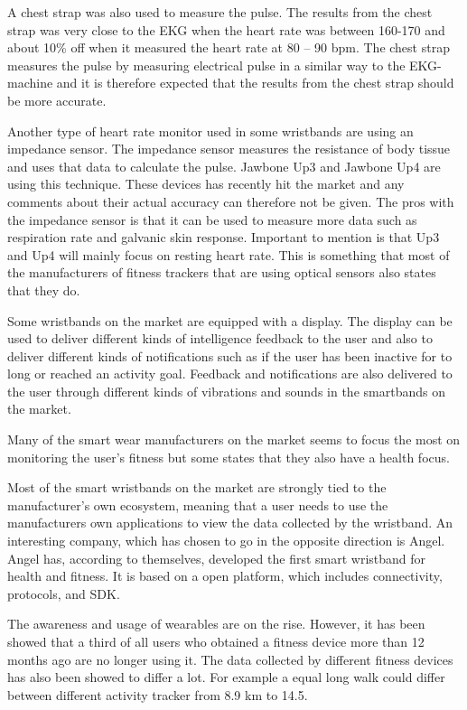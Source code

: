 \documentclass{cslthse-msc}
\begin{document}
A chest strap was also used to measure the pulse. The results from the chest strap was very close to the EKG when the heart rate was between 160-170 and about 10\% off when it measured the heart rate at 80 – 90 bpm. The chest strap measures the pulse by measuring electrical pulse in a similar way to the EKG-machine and it is therefore expected that the results from the chest strap should be more accurate. 

Another type of heart rate monitor used in some wristbands are using an impedance sensor. The impedance sensor measures the resistance of body tissue and uses that data to calculate the pulse. Jawbone Up3 and Jawbone Up4 are using this technique. These devices has recently hit the market and any comments about their actual accuracy can therefore not be given. The pros with the impedance sensor is that it can be used to measure more data such as respiration rate and galvanic skin response. Important to mention is that Up3 and Up4 will mainly focus on resting heart rate. This is something that most of the manufacturers of fitness trackers that are using optical sensors also states that they do. 

Some wristbands on the market are equipped with a display. The display can be used to deliver different kinds of intelligence feedback to the user and also to deliver different kinds of notifications such as if the user has been inactive for to long or reached an activity goal.  Feedback and notifications are also delivered to the user through different kinds of vibrations and sounds in the smartbands on the market. 

Many of the smart wear manufacturers on the market seems to focus the most on monitoring the user’s fitness but some states that they also have a health focus.

Most of the smart wristbands on the market are strongly tied to the manufacturer’s own ecosystem, meaning that a user needs to use the manufacturers own applications to view the data collected by the wristband. An interesting company, which has chosen to go in the opposite direction is Angel. Angel has, according to themselves\cite{angelfaq}, developed the first smart wristband for health and fitness. It is based on a open platform, which includes connectivity, protocols, and SDK. 

The awareness and usage of wearables are on the rise. However, it has been showed that a third of all users who obtained a fitness device more than 12 months ago are no longer using it. The data collected by different fitness devices has also been showed to differ a lot. For example a equal long walk could differ between different activity tracker from 8.9 km to 14.5\cite{wearable-technology-cannot-be-trusted}.
\end{document}
